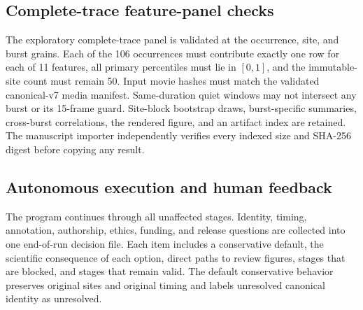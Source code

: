 \subsection{Complete-trace feature-panel checks}

The exploratory complete-trace panel is validated at the occurrence, site, and
burst grains. Each of the 106 occurrences must contribute exactly one row for
each of 11 features, all primary percentiles must lie in $[0,1]$, and the
immutable-site count must remain 50. Input movie hashes must match the validated
canonical-v7 media manifest. Same-duration quiet windows may not intersect any
burst or its 15-frame guard. Site-block bootstrap draws, burst-specific
summaries, cross-burst correlations, the rendered figure, and an artifact index
are retained. The manuscript importer independently verifies every indexed
size and SHA-256 digest before copying any result.

\subsection{Autonomous execution and human feedback}

The program continues through all unaffected stages. Identity, timing, annotation, authorship, ethics, funding, and release questions are collected into one end-of-run decision file. Each item includes a conservative default, the scientific consequence of each option, direct paths to review figures, stages that are blocked, and stages that remain valid. The default conservative behavior preserves original sites and original timing and labels unresolved canonical identity as unresolved.
